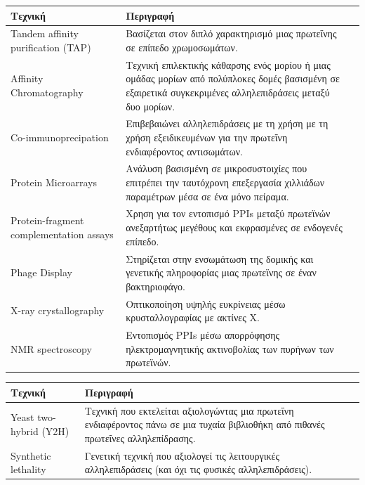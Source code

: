\newpage
\begingroup
\centering
\begin{tabularx}{0.9\textwidth} { 
  | >{\raggedright\arraybackslash}X 
  | >{\centering\arraybackslash}X 
  | >{\raggedleft\arraybackslash}X | }
 \hline
 \textbf{Τεχνική} & \textbf{Περιγραφή}\\
 \hline
 Tandem affinity purification (TAP) & Βασίζεται στον διπλό χαρακτηρισμό μιας πρωτεΐνης σε επίπεδο χρωμοσωμάτων.\\
 \hline
 Affinity Chromatography & Τεχνική επιλεκτικής κάθαρσης ενός μορίου ή μιας ομάδας μορίων από πολύπλοκες δομές βασισμένη σε εξαιρετικά συγκεκριμένες αλληλεπιδράσεις μεταξύ δυο μορίων.\\
 \hline
 Co-immunoprecipation & Επιβεβαιώνει αλληλεπιδράσεις με τη χρήση με τη χρήση εξειδικευμένων για την πρωτεΐνη ενδιαφέροντος αντισωμάτων.\\
 \hline
 Protein Microarrays & Ανάλυση βασισμένη σε μικροσυστοιχίες που επιτρέπει την ταυτόχρονη επεξεργασία χιλλιάδων παραμέτρων μέσα σε ένα μόνο πείραμα.\\
 \hline
 Protein-fragment complementation assays & Χρηση για τον εντοπισμό PPIs μεταξύ πρωτεϊνών ανεξαρτήτως μεγέθους και εκφρασμένες σε ενδογενές επίπεδο.\\
 \hline
 Phage Display & Στηρίζεται στην ενσωμάτωση της δομικής και γενετικής πληροφορίας μιας πρωτεϊνης σε έναν βακτηριοφάγο.\\
 \hline
 X-ray crystallography & Οπτικοποίηση υψηλής ευκρίνειας μέσω κρυσταλλογραφίας με ακτίνες Χ.\\
 \hline
 NMR spectroscopy & Εντοπισμός PPIs μέσω απορρόφησης ηλεκτρομαγνητικής ακτινοβολίας των πυρήνων των πρωτεϊνών.\\
 \hline
\end{tabularx}
\label{In vitro τεχνικές εντοπισμού PPIs}
\endgroup

\begingroup
\centering
\begin{tabularx}{1\textwidth} { 
  | >{\raggedright\arraybackslash}X 
  | >{\centering\arraybackslash}X 
  | >{\raggedleft\arraybackslash}X | }
 \hline
 \textbf{Τεχνική} & \textbf{Περιγραφή}\\
 \hline
 Yeast two-hybrid (Y2H) & Τεχνική που εκτελείται αξιολογώντας μια πρωτεΐνη ενδιαφέροντος πάνω σε μια τυχαία βιβλιοθήκη από πιθανές πρωτεΐνες αλληλεπίδρασης. \\ 
 \hline
 Synthetic lethality & Γενετική τεχνική που αξιολογεί τις λειτουργικές αλληλεπιδράσεις (και όχι τις φυσικές αλληλεπιδράσεις). \\
 \hline
 \end{tabularx}
\label{In vivo τεχνικές εντοπισμού PPIs}
 \endgroup
 
